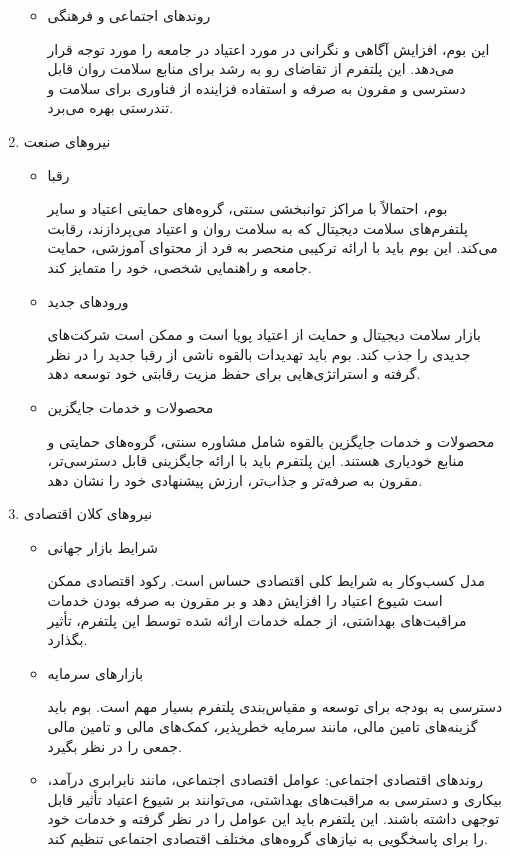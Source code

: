 \documentclass[dvipsnames, svgnames, x11names, 11pt]{article}
\begin{document}
\begin{enumerate}
\begin{itemize}
\item
روندهای اجتماعی و فرهنگی

این بوم، افزایش آگاهی و نگرانی در مورد اعتیاد در جامعه را مورد توجه قرار می‌دهد. این پلتفرم از تقاضای رو به رشد برای منابع سلامت روان قابل دسترسی و مقرون به صرفه و استفاده فزاینده از فناوری برای سلامت و تندرستی بهره می‌برد.
\end{itemize}

\item 
نیروهای صنعت 

\begin{itemize}
\item
رقبا

بوم، احتمالاً با مراکز توانبخشی سنتی، گروه‌های حمایتی اعتیاد و سایر پلتفرم‌های سلامت دیجیتال که به سلامت روان و اعتیاد می‌پردازند، رقابت می‌کند. این بوم باید با ارائه ترکیبی منحصر به فرد از محتوای آموزشی، حمایت جامعه و راهنمایی شخصی، خود را متمایز کند.

\item
ورودهای جدید

بازار سلامت دیجیتال و حمایت از اعتیاد پویا است و ممکن است شرکت‌های جدیدی را جذب کند. بوم باید تهدیدات بالقوه ناشی از رقبا جدید را در نظر گرفته و استراتژی‌هایی برای حفظ مزیت رقابتی خود توسعه دهد.

\item
محصولات و خدمات جایگزین

محصولات و خدمات جایگزین بالقوه شامل مشاوره سنتی، گروه‌های حمایتی و منابع خودیاری هستند. این پلتفرم باید با ارائه جایگزینی قابل دسترسی‌تر، مقرون به صرفه‌تر و جذاب‌تر، ارزش پیشنهادی خود را نشان دهد.
\end{itemize}

\item
نیروهای کلان اقتصادی 

\begin{itemize}
\item
شرایط بازار جهانی

مدل کسب‌وکار به شرایط کلی اقتصادی حساس است. رکود اقتصادی ممکن است شیوع اعتیاد را افزایش دهد و بر مقرون به صرفه بودن خدمات مراقبت‌های بهداشتی، از جمله خدمات ارائه شده توسط این پلتفرم، تأثیر بگذارد.

\item
بازارهای سرمایه

دسترسی به بودجه برای توسعه و مقیاس‌بندی پلتفرم بسیار مهم است. بوم باید گزینه‌های تامین مالی، مانند سرمایه خطرپذیر، کمک‌های مالی و تامین مالی جمعی را در نظر بگیرد.

\item
روندهای اقتصادی اجتماعی: عوامل اقتصادی اجتماعی، مانند نابرابری درآمد، بیکاری و دسترسی به مراقبت‌های بهداشتی، می‌توانند بر شیوع اعتیاد تأثیر قابل توجهی داشته باشند. این پلتفرم باید این عوامل را در نظر گرفته و خدمات خود را برای پاسخگویی به نیازهای گروه‌های مختلف اقتصادی اجتماعی تنظیم کند.


\end{itemize}
\end{enumerate}
\end{document}
